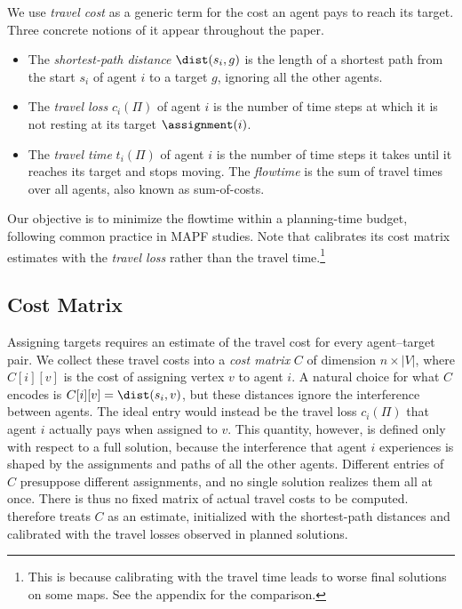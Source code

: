 We use \emph{travel cost} as a generic term for the cost an agent pays to reach its target.
Three concrete notions of it appear throughout the paper.
\begin{itemize}
    \item The \emph{shortest-path distance} $\dist(s_i, g)$ is the length of a shortest path from the start $s_i$ of agent $i$ to a target $g$, ignoring all the other agents.
    \item The \emph{travel loss} $c_i(\Pi)$ of agent $i$ is the number of time steps at which it is not resting at its target $\assignment(i)$.
    \item The \emph{travel time} $t_i(\Pi)$ of agent $i$ is the number of time steps it takes until it reaches its target and stops moving.
    The \emph{flowtime} is the sum of travel times over all agents, also known as sum-of-costs.
\end{itemize}
Our objective is to minimize the flowtime within a planning-time budget, following common practice in MAPF studies.
Note that \planner calibrates its cost matrix estimates with the \emph{travel loss} rather than the travel time.\footnote{This is because calibrating with the travel time leads to worse final solutions on some maps. See the appendix for the comparison.}

\subsection{Cost Matrix}
\label{sec:cost-matrix}
Assigning targets requires an estimate of the travel cost for every agent--target pair.
We collect these travel costs into a \emph{cost matrix} $C$ of dimension $n \times |V|$, where $C[i][v]$ is the cost of assigning vertex $v$ to agent $i$.
A natural choice for what $C$ encodes is $C[i][v] = \dist(s_i, v)$, but these distances ignore the interference between agents.
The ideal entry would instead be the travel loss $c_i(\Pi)$ that agent $i$ actually pays when assigned to $v$.
This quantity, however, is defined only with respect to a full solution, because the interference that agent $i$ experiences is shaped by the assignments and paths of all the other agents.
Different entries of $C$ presuppose different assignments, and no single solution realizes them all at once.
There is thus no fixed matrix of actual travel costs to be computed.
\planner therefore treats $C$ as an estimate, initialized with the shortest-path distances and calibrated with the travel losses observed in planned solutions.


